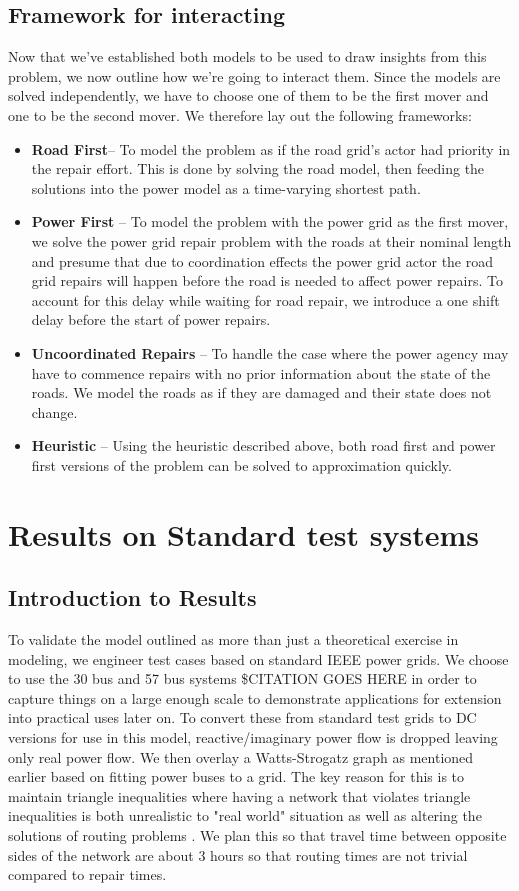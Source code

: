 \documentclass{article}
\begin{document}
	\subsection{Framework for interacting}
	Now that we've established both models to be used to draw insights from this problem, we now outline how we're going to interact them. Since the models are solved independently, we have to choose one of them to be the first mover and one to be the second mover. We therefore lay out the following frameworks:
	\begin{itemize}
		\item \textbf{Road First}-- To model the problem as if the road grid's actor had priority in the repair effort. This is done by solving the road model, then feeding the solutions into the power model as a time-varying shortest path.
		\item \textbf{Power First} -- To model the problem with the power grid as the first mover, we solve the power grid repair problem with the roads at their nominal length and presume that due to coordination effects the power grid actor the road grid repairs will happen before the road is needed to affect power repairs. To account for this delay while waiting for road repair, we introduce a one shift delay before the start of power repairs.
		\item \textbf{Uncoordinated Repairs} -- To handle the case where the power agency may have to commence repairs with no prior information about the state of the roads. We model the roads as if they are damaged and their state does not change.
		\item \textbf{Heuristic} -- Using the heuristic described above, both road first and power first versions of the problem can be solved to approximation quickly.
	\end{itemize}
	\section{Results on Standard test systems}
	\subsection{Introduction to Results}
	To validate the model outlined as more than just a theoretical exercise in modeling, we engineer test cases based on standard IEEE power grids. We choose to use the 30 bus and 57 bus systems \$CITATION GOES HERE in order to capture things on a large enough scale to demonstrate applications for extension into practical uses later on. To convert these from standard test grids to DC versions for use in this model, reactive/imaginary power flow is dropped leaving only real power flow. We then overlay a Watts-Strogatz graph as mentioned earlier based on fitting power buses to a grid. The key reason for this is to maintain triangle inequalities where having a network that violates triangle inequalities is both unrealistic to "real world" situation as well as altering the solutions of routing problems \cite{FlemingEA2013}. We plan this so that travel time between opposite sides of the network are about 3 hours so that routing times are not trivial compared to repair times.
	
\end{document}
